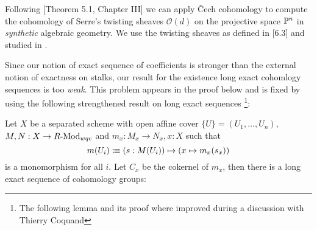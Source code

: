 
Following \cite{Hartshorne}[Theorem 5.1, Chapter III] we can apply \v{C}ech cohomology to compute
the cohomology of Serre's twisting sheaves $\mathcal O(d)$ on the projective space $\mathbb{P}^n$ in \emph{synthetic} algebraic geometry.
We use the twisting sheaves as defined in \cite{draft}[6.3] and studied in \cite{sag-projective}.

Since our notion of exact sequence of coefficients is stronger than the external notion of exactness on stalks, our result for the existence long exact cohomlogy sequences is too \emph{weak}.
This problem appears in the proof below and is fixed by using the following strengthened result on long exact sequences
\footnote{The following lemma and its proof where improved during a discussion with Thierry Coquand}:

\begin{lemma}
  Let $X$ be a separated scheme with open affine cover $\{U\}=(U_1,\dots,U_n)$,
  $M,N:X\to R\text{-}\mathrm{Mod}_{wqc}$ and $m_x:M_x\to N_x, x:X$ such that
  \[
    m(U_i)\vcentcolon\mspace{-1.2mu}\equiv (s:M(U_i)) \mapsto (x\mapsto m_x(s_x))
  \]
  is a monomorphism for all $i$.
  Let $C_x$ be the cokernel of $m_x$, then there is a long exact sequence of cohomology groups:
  \begin{center}
  \end{center}
\end{lemma}

